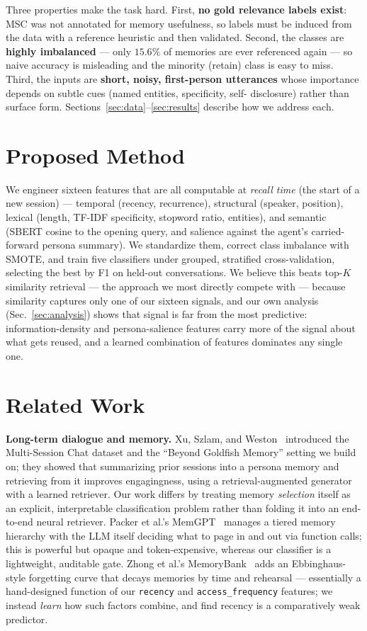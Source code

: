\documentclass[11pt]{article}
\begin{document}
Three properties make the task hard. First, \textbf{no gold relevance labels
exist}: MSC was not annotated for memory usefulness, so labels must be induced
from the data with a reference heuristic and then validated. Second, the classes
are \textbf{highly imbalanced} --- only $15.6\%$ of memories are ever referenced
again --- so naive accuracy is misleading and the minority (retain) class is easy
to miss. Third, the inputs are \textbf{short, noisy, first-person utterances}
whose importance depends on subtle cues (named entities, specificity, self-
disclosure) rather than surface form. Sections~\ref{sec:data}--\ref{sec:results}
describe how we address each.

\section{Proposed Method}
We engineer sixteen features that are all computable at \emph{recall time} (the
start of a new session) --- temporal (recency, recurrence), structural (speaker,
position), lexical (length, TF-IDF specificity, stopword ratio, entities), and
semantic (SBERT cosine to the opening query, and salience against the agent's
carried-forward persona summary). We standardize them, correct class imbalance
with SMOTE, and train five classifiers under grouped, stratified cross-validation,
selecting the best by F1 on held-out conversations. We believe this beats top-$K$
similarity retrieval --- the approach we most directly compete with --- because
similarity captures only one of our sixteen signals, and our own analysis
(Sec.~\ref{sec:analysis}) shows that signal is far from the most predictive:
information-density and persona-salience features carry more of the signal about
what gets reused, and a learned combination of features dominates any single one.

\section{Related Work}
\textbf{Long-term dialogue and memory.} Xu, Szlam, and Weston~\cite{msc} introduced
the Multi-Session Chat dataset and the ``Beyond Goldfish Memory'' setting we build
on; they showed that summarizing prior sessions into a persona memory and
retrieving from it improves engagingness, using a retrieval-augmented generator
with a learned retriever. Our work differs by treating memory \emph{selection}
itself as an explicit, interpretable classification problem rather than folding it
into an end-to-end neural retriever. Packer et al.'s MemGPT~\cite{memgpt} manages a
tiered memory hierarchy with the LLM itself deciding what to page in and out via
function calls; this is powerful but opaque and token-expensive, whereas our
classifier is a lightweight, auditable gate. Zhong et al.'s MemoryBank~\cite{memorybank}
adds an Ebbinghaus-style forgetting curve that decays memories by time and
rehearsal --- essentially a hand-designed function of our \texttt{recency} and
\texttt{access\_frequency} features; we instead \emph{learn} how such factors
combine, and find recency is a comparatively weak predictor.
\end{document}

